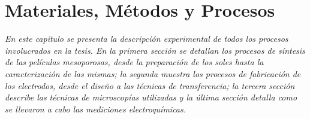  \newcommand{\NoBiblioMat}[1]{
 \ifthenelse{\equal{#1}{verdadero}}{}{}
 \NoBiblioMat{verdadero}}


 \FormatoCapituloUnaLinea

 \chapter{Materiales, Métodos y Procesos}
 \label{chap:Materiales}

 \thispagestyle{empty}
	
  \noindent\textit{En este capitulo se presenta la descripción experimental de todos los procesos involucrados en la tesis. En la primera sección se detallan los procesos de síntesis de las películas mesoporosas, desde la preparación de los soles hasta la caracterización de las mismas; la segunda muestra los procesos de fabricación de los electrodos, desde el diseño a las técnicas de transferencia; la tercera sección describe las técnicas de microscopías utilizadas y la última sección detalla como se llevaron a cabo las mediciones electroquímicas.}


 \vfill
 \minitoc
 \newpage


